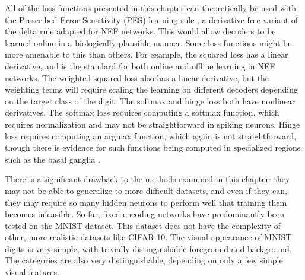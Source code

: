 All of the loss functions presented in this chapter
can theoretically be used with the Prescribed Error Sensitivity (PES)
learning rule \parencite{MacNeil2011,Bekolay2013},
a derivative-free variant of the delta rule adapted for NEF networks.
This would allow decoders to be learned online in a biologically-plausible manner.
Some loss functions might be more amenable to this than others.
For example, the squared loss has a linear derivative,
and is the standard for both online and offline learning in NEF networks.
The weighted squared loss also has a linear derivative,
but the weighting terms will require scaling the learning on different decoders
depending on the target class of the digit.
The softmax and hinge loss both have nonlinear derivatives.
The softmax loss requires computing a softmax function,
which requires normalization and may not be straightforward in spiking neurons.
Hinge loss requires computing an argmax function,
which again is not straightforward,
though there is evidence for such functions being computed
in specialized regions such as the basal ganglia \parencite{Redgrave1999}.

There is a significant drawback to the methods examined in this chapter:
they may not be able to generalize to more difficult datasets,
and even if they can, they may require so many hidden neurons to perform well
that training them becomes infeasible.
So far, fixed-encoding networks have predominantly been tested
on the MNIST dataset.
This dataset does not have the complexity of other,
more realistic datasets like CIFAR-10.
The visual appearance of MNIST digits is very simple,
with trivially distinguishable foreground and background.
The categories are also very distinguishable,
depending on only a few simple visual features.

